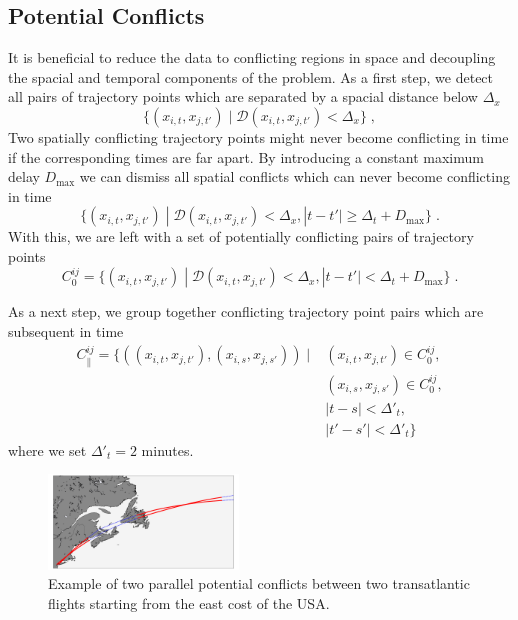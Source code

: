 \subsection{Potential Conflicts}
It is beneficial to reduce the data to conflicting regions in space and decoupling the spacial and temporal components of the problem.
As a first step, we detect all pairs of trajectory points which are separated by a spacial distance below $\Delta_x$ 
\begin{equation*}
    \{ (x_{i, t},  x_{j, t'}) \; | \; \mathcal{D} (x_{i, t}, x_{j, t'}) < \Delta_x \} \; ,
\end{equation*}
Two spatially conflicting trajectory points might never become conflicting in time if the corresponding times are far apart.
By introducing a constant maximum delay $D_{\max}$ we can dismiss all spatial conflicts which can never become conflicting in time
\begin{equation*}
    \{ (x_{i, t},  x_{j, t'}) \; | \; \mathcal{D} (x_{i, t}, x_{j, t'}) < \Delta_x , |t-t'| \geq \Delta_t + D_\text{max} \} \; .
\end{equation*}
With this, we are left with a set of potentially conflicting pairs of trajectory points
\begin{equation*}
    C^{ij}_0 = \{ (x_{i, t},  x_{j, t'}) \; | \; \mathcal{D} (x_{i, t}, x_{j, t'}) < \Delta_x , |t-t'| < \Delta_t + D_\text{max} \} \; .
\end{equation*}

As a next step, we group together conflicting trajectory point pairs which are subsequent in time
\begin{align*}
    C^{ij}_\parallel = \{ ((x_{i, t},  x_{j, t'}),  (x_{i, s},  x_{j, s'})) \; | \; & (x_{i, t},  x_{j, t'}) \in C^{ij}_0, \\
                                                                                    & (x_{i, s},  x_{j, s'}) \in C^{ij}_0, \\ 
                                                                                    & |t - s| < \Delta'_t,  \\
                                                                                    & |t' - s'| < \Delta'_t \}
\end{align*}
where we set $\Delta'_t = 2$ minutes.

\begin{figure}[t]
    \begin{center}
        \includegraphics[width=0.45\textwidth]{./pics/example_conflict_in_real_space.pdf}
    \end{center}
\caption{Example of two parallel potential conflicts between two transatlantic flights starting from the east cost of the USA.}
\label{fig:example_parallel_conflict}
\end{figure}

